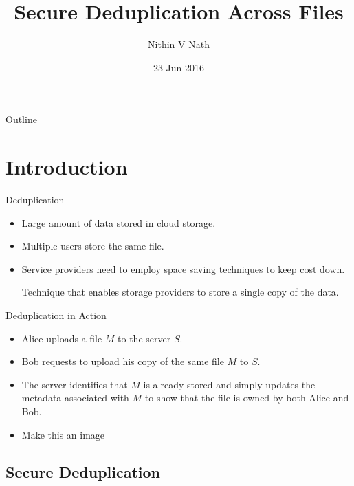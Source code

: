 \documentclass{beamer}
\title{Secure Deduplication Across Files}
\author{Nithin V Nath }
\institute[] %
{
	Advisor: Dr. Bhavana Kanukurthi\\\vspace*{2mm}
	Department of Computer Science and Automation\\
	Indian Institute of Science
}
\date{23-Jun-2016}
\begin{document}
\begin{frame}
  \titlepage
\end{frame}

\begin{frame}{Outline}
  \tableofcontents
\end{frame}

\section{Introduction}

\begin{frame}{Deduplication}{}
  \begin{itemize}
  \setlength\itemsep{1em}
  \item {
    Large amount of data stored in cloud storage.
  }
  \item {
    Multiple users store the same file.
  }
  \item {
    Service providers need to employ space saving techniques to keep cost down.
  }
	\begin{definition}
		Technique that enables storage providers to store a single copy of the data.
	\end{definition}
  \end{itemize}
\end{frame}

\begin{frame}{Deduplication in Action}
  \begin{itemize}
  \setlength\itemsep{1em}
  \item {
    Alice uploads a file $M$ to the server $S$.
  }
  \item {   
	 Bob requests to upload his copy of the same file $M$ to $S$.
  }
  \item{The server identifies
	that $M$ is already stored and simply updates the metadata associated with $M$ to show
	that the file is owned by both Alice and Bob.
  }
  \item Make this an image
  \end{itemize}
\end{frame}

\subsection{Secure Deduplication}
\end{document}
